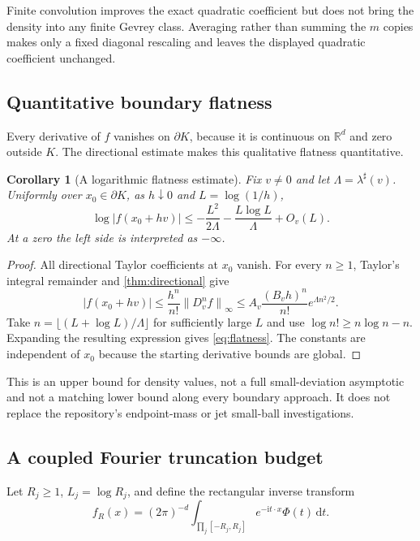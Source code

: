 \documentclass[11pt,a4paper]{article}
\numberwithin{equation}{section}
\newtheorem{corollary}[theorem]{Corollary}
\theoremstyle{definition}
\theoremstyle{remark}\newtheorem{remark}[theorem]{Remark}
\newcommand{\R}{\mathbb R}\newcommand{\N}{\mathbb N}
\newcommand{\dd}{\,\mathrm d}
\newcommand{\ii}{\mathrm i}
\newcommand{\norm}[1]{\left\lVert #1\right\rVert}
\begin{document}
Finite convolution improves the exact quadratic coefficient but does not
bring the density into any finite Gevrey class. Averaging rather than summing
the $m$ copies makes only a fixed diagonal rescaling and leaves the displayed
quadratic coefficient unchanged.

\subsection{Quantitative boundary flatness}

Every derivative of $f$ vanishes on $\partial K$, because it is continuous
on $\R^d$ and zero outside $K$. The directional estimate makes this
qualitative flatness quantitative.

\begin{corollary}[A logarithmic flatness estimate]
\label{cor:flatness}
Fix $v\ne0$ and let $\Lambda=\lambda^\sharp(v)$. Uniformly over
$x_0\in\partial K$, as $h\downarrow0$ and $L=\log(1/h)$,
\begin{equation}
 \log|f(x_0+hv)|
 \le-\frac{L^2}{2\Lambda}-\frac{L\log L}{\Lambda}+O_v(L).
 \label{eq:flatness}
\end{equation}
At a zero the left side is interpreted as $-\infty$.
\end{corollary}
\begin{proof}
All directional Taylor coefficients at $x_0$ vanish. For every $n\ge1$,
Taylor's integral remainder and \cref{thm:directional} give
\[
 |f(x_0+hv)|\le\frac{h^n}{n!}\norm{D_v^nf}_\infty
       \le A_v\frac{(B_vh)^n}{n!}e^{\Lambda n^2/2}.
\]
Take $n=\lfloor(L+\log L)/\Lambda\rfloor$ for sufficiently large $L$ and
use $\log n!\ge n\log n-n$. Expanding the resulting expression gives
\eqref{eq:flatness}. The constants are independent of $x_0$ because the
starting derivative bounds are global.
\end{proof}

This is an upper bound for density values, not a full small-deviation
asymptotic and not a matching lower bound along every boundary approach.
It does not replace the repository's endpoint-mass or jet small-ball
investigations.

\subsection{A coupled Fourier truncation budget}

Let $R_j\ge1$, $L_j=\log R_j$, and define the rectangular inverse transform
\begin{equation}
 f_R(x)=(2\pi)^{-d}\int_{\prod_j[-R_j,R_j]}
                          e^{-\ii t\cdot x}\Phi(t)\dd t.
 \label{eq:truncated}
\end{equation}
\end{document}
